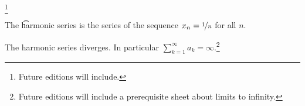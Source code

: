 
\footnote{Future editions will include.}


The \t{harmonic series} is the series of the sequence $x_n = \nicefrac{1}{n}$ for all $n$.

\begin{proposition}
  The harmonic series diverges. In particular $\sum_{k = 1}^{\infty} a_k = \infty$.\footnote{Future editions will include a prerequisite sheet about limits to infinity.}
\end{proposition}

\blankpage
